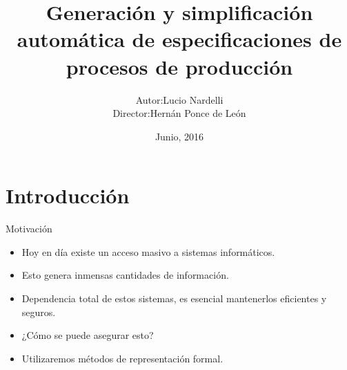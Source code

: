 \documentclass[spanish,pdf]{beamer}
\begin{document}
  
\title[Gen. y simp. de especificaciones de procesos de producción]{Generación y simplificación automática de especificaciones de procesos de producción}
\author[Lucio Nardelli]{\begin{tabular}{r@{ }l} 
  Autor:      & Lucio Nardelli \\[1ex]
  Director:   & Hernán Ponce de León\\
  \end{tabular}}
\date{Junio, 2016}
  
\begin{frame}
  \titlepage
\end{frame}
  
  
\section{Introducción}
  
\begin{frame}{Motivación}{}
    \begin{itemize}
      \setlength\itemsep{0.4cm}
      \item<2-> Hoy en día existe un acceso masivo a sistemas informáticos.
      \item<3-> Esto genera inmensas cantidades de información.
      \item<4-> Dependencia total de estos sistemas, es esencial mantenerlos eficientes y seguros.
      \item<5-> ¿Cómo se puede asegurar esto?
      \item<6-> Utilizaremos métodos de representación formal.
    \end{itemize}
\end{frame}
\end{document}
